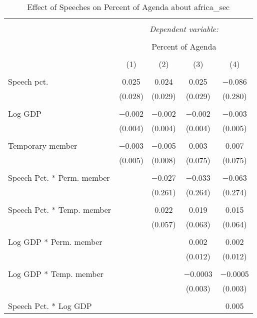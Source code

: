 
\begin{table}[!htbp] \centering 
  \caption{Effect of Speeches on Percent of Agenda about  africa_sec} 
  \label{} 
\begin{tabular}{@{\extracolsep{5pt}}lcccc} 
\\[-1.8ex]\hline 
\hline \\[-1.8ex] 
 & \multicolumn{4}{c}{\textit{Dependent variable:}} \\ 
\cline{2-5} 
\\[-1.8ex] & \multicolumn{4}{c}{Percent of Agenda} \\ 
\\[-1.8ex] & (1) & (2) & (3) & (4)\\ 
\hline \\[-1.8ex] 
 Speech pct. & 0.025 & 0.024 & 0.025 & $-$0.086 \\ 
  & (0.028) & (0.029) & (0.029) & (0.280) \\ 
  & & & & \\ 
 Log GDP & $-$0.002 & $-$0.002 & $-$0.002 & $-$0.003 \\ 
  & (0.004) & (0.004) & (0.004) & (0.005) \\ 
  & & & & \\ 
 Temporary member & $-$0.003 & $-$0.005 & 0.003 & 0.007 \\ 
  & (0.005) & (0.008) & (0.075) & (0.075) \\ 
  & & & & \\ 
 Speech Pct. * Perm. member &  & $-$0.027 & $-$0.033 & $-$0.063 \\ 
  &  & (0.261) & (0.264) & (0.274) \\ 
  & & & & \\ 
 Speech Pct. * Temp. member &  & 0.022 & 0.019 & 0.015 \\ 
  &  & (0.057) & (0.063) & (0.064) \\ 
  & & & & \\ 
 Log GDP * Perm. member &  &  & 0.002 & 0.002 \\ 
  &  &  & (0.012) & (0.012) \\ 
  & & & & \\ 
 Log GDP * Temp. member &  &  & $-$0.0003 & $-$0.0005 \\ 
  &  &  & (0.003) & (0.003) \\ 
  & & & & \\ 
 Speech Pct. * Log GDP &  &  &  & 0.005 \\ 

\end{tabular}
\end{table}
